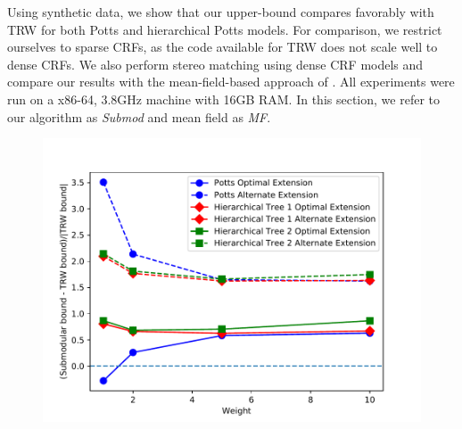 \label{sec:exp}
Using synthetic data, we show that our upper-bound compares favorably with TRW
for both Potts and hierarchical Potts models. For comparison, we restrict
ourselves to sparse CRFs, as the code available for TRW does not scale well to
dense CRFs. We also perform stereo matching using dense CRF models and compare
our results with the mean-field-based approach of \citep{koltun2011efficient}.
All experiments were run on a x86-64, 3.8GHz machine with 16GB RAM. In this
section, we refer to our algorithm as \emph{Submod} and mean field as \emph{MF}. 

\begin{figure}
\centering
\includegraphics[scale = 0.50]{./figures/synthetic_upper_bound_comparison.pdf}
\label{fig:syn_plot}
\end{figure}

